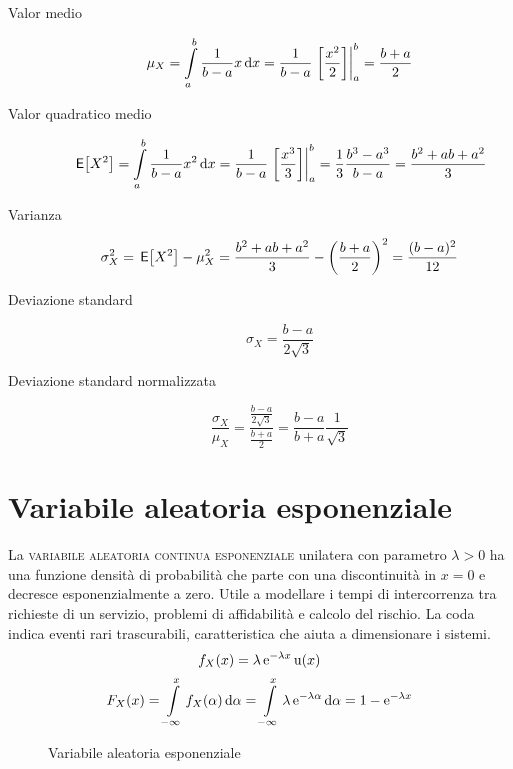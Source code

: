\begin{description}
\item[Valor medio]
\[\mu_X=\intd{a}{b}{\frac{1}{b-a}x}{x}=\frac{1}{b-a}\bound{a}{b}{\frac{x^2}{2}}=\frac{b+a}{2}
\]
\item[Valor quadratico medio] 
\[\E{X^2}=\intd{a}{b}{\frac{1}{b-a}x^2}{x}=\frac{1}{b-a}\bound{a}{b}{\frac{x^3}{3}}=\frac{1}{3}\frac{b^3-a^3}{b-a}=\frac{b^2+a b+a^2}{3}
\]
\item[Varianza]
\[\sigma^2_X=\E{X^2}-\mu^2_X=\frac{b^2+a b+a^2}{3}-\left(\frac{b+a}{2}\right)^2=\frac{(b-a)^2}{12}
\]
\item[Deviazione standard]
\[\sigma_X=\frac{b-a}{2\sqrt{3}}
\]
\item[Deviazione standard normalizzata]
\[\frac{\sigma_X}{\mu_X}=\frac{\frac{b-a}{2\sqrt{3}}}{\frac{b+a}{2}}=\frac{b-a}{b+a}\frac{1}{\sqrt{3}}
\]
\end{description}

\section{Variabile aleatoria esponenziale}
La \textsc{variabile aleatoria continua esponenziale} unilatera con parametro $\lambda>0$ ha una funzione densità di probabilità che parte con una discontinuità in $x=0$ e decresce esponenzialmente a zero. Utile a modellare i tempi di intercorrenza tra richieste di un servizio, problemi di affidabilità e calcolo del rischio. La coda indica eventi rari trascurabili, caratteristica che aiuta a dimensionare i sistemi.
\begin{equation}
	f_X(x)=\lambda\e{-\lambda x}\step(x)
\end{equation}
\begin{equation}
	F_X(x)=\intd{-\infty}{x}{f_X(\alpha)}{\alpha}=\intd{-\infty}{x}{\lambda\e{-\lambda \alpha}}{\alpha}=1-\e{-\lambda x}
\end{equation}
\begin{figure}[!ht]
	\centering
	\qquad
	\caption{Variabile aleatoria esponenziale}
\end{figure}

